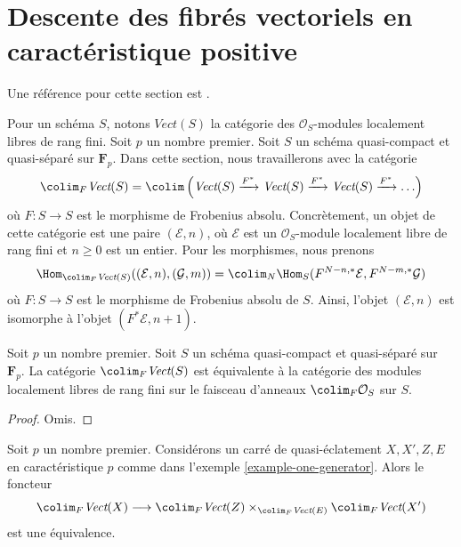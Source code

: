 \section{Descente des fibrés vectoriels en caractéristique positive}
\label{section-descent-vectorbundles-h}

\noindent
Une référence pour cette section est \cite{Witt-Grass}.

\medskip\noindent
Pour un schéma $S$, notons $\textit{Vect}(S)$ la catégorie
des $\mathcal{O}_S$-modules localement libres de rang fini.
Soit $p$ un nombre premier. Soit $S$ un schéma quasi-compact et quasi-séparé
sur $\mathbf{F}_p$. Dans cette section, nous travaillerons avec la
catégorie
$$
\colim_F \textit{Vect}(S) =
\colim
\left(
\textit{Vect}(S) \xrightarrow{F^*}
\textit{Vect}(S) \xrightarrow{F^*}
\textit{Vect}(S) \xrightarrow{F^*} \ldots
\right)
$$
où $F : S \to S$ est le morphisme de Frobenius absolu. Concrètement,
un objet de cette catégorie est une paire $(\mathcal{E}, n)$,
où $\mathcal{E}$ est un $\mathcal{O}_S$-module localement libre de rang fini
et $n \geq 0$ est un entier. Pour les morphismes, nous prenons
$$
\Hom_{\colim_F \textit{Vect}(S)}((\mathcal{E}, n), (\mathcal{G}, m)) =
\colim_N \Hom_S(F^{N - n, *}\mathcal{E}, F^{N - m, *}\mathcal{G})
$$
où $F : S \to S$ est le morphisme de Frobenius absolu de $S$.
Ainsi, l'objet $(\mathcal{E}, n)$ est isomorphe à l'objet
$(F^*\mathcal{E}, n + 1)$.

\begin{lemma}
\label{lemma-colim-F-Vect}
Soit $p$ un nombre premier. Soit $S$ un schéma quasi-compact et quasi-séparé
sur $\mathbf{F}_p$. La catégorie $\colim_F \textit{Vect}(S)$
est équivalente à la catégorie des modules localement libres de rang fini
sur le faisceau d'anneaux $\colim_F \mathcal{O}_S$ sur $S$.
\end{lemma}

\begin{proof}
Omis.
\end{proof}

\begin{lemma}
\label{lemma-vector-bundle-I}
Soit $p$ un nombre premier. Considérons un carré de quasi-éclatement $X, X', Z, E$
en caractéristique $p$ comme dans l'exemple \ref{example-one-generator}.
Alors le foncteur
$$
\colim_F \textit{Vect}(X)
\longrightarrow
\colim_F \textit{Vect}(Z)
\times_{\colim_F \textit{Vect}(E)}
\colim_F \textit{Vect}(X')
$$
est une équivalence.
\end{lemma}

